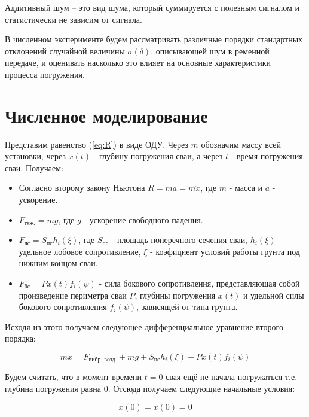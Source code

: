 \begin{definition}
    Аддитивный шум -- это вид шума, который суммируется с полезным сигналом и статистически не зависим
    от сигнала.
\end{definition}

В численном эксперименте будем рассматривать различные порядки стандартных отклонений случайной
величины $\sigma(\delta)$, описывающей шум в ременной передаче, и оценивать насколько это влияет на
основные характеристики процесса погружения.

\clearpage

\section{Численное моделирование}

Представим равенство (\ref{eq:R}) в виде ОДУ. Через $m$ обозначим массу всей установки, через $x(t)$ - глубину
погружения сваи, а через $t$ - время погружения сваи. Получаем:

\begin{itemize}
\item Согласно второму закону Ньютона $R = ma = m\ddot{x}$, где $m$ - масса и $a$ - ускорение.
\item $F_\text{тяж.} = mg$, где $g$ - ускорение свободного падения.
\item $F_\text{лс} = S_\text{пс} h_i(\xi)$, где $S_\text{пс}$ - площадь поперечного сечения сваи,
$h_i(\xi)$ - удельное лобовое сопротивление, $\xi$ - коэфициент условий работы грунта под нижним концом сваи.
\item $F_\text{бс} = P x(t) f_i(\psi)$ - сила бокового сопротивления, представляющая собой произведение периметра сваи
$P$, глубины погружения $x(t)$ и удельной силы бокового сопротивления $f_i(\psi)$, зависящей от типа грунта.
\end{itemize}

\noindent Исходя из этого получаем следующее дифференциальное уравнение второго порядка:

\begin{equation}
    \label{eq:main}
    m\ddot{x} = F_\text{вибр. возд.} + mg + S_\text{пс} h_i(\xi) + P x(t) f_i(\psi)
\end{equation}

\noindent Будем считать, что в момент времени $t = 0$ свая ещё не начала погружаться т.е.
глубина погружения равна 0. Отсюда получаем следующие начальные условия:

\begin{equation}
    x(0) = \dot{x}(0) = 0
\end{equation}

